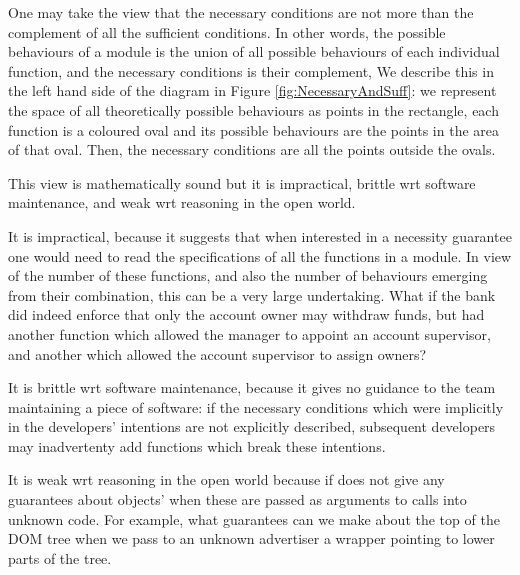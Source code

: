 One may take the view that the necessary conditions are not more than the complement of all the sufficient conditions.
In other words, the possible behaviours of a module is the union of all possible behaviours of 
each individual function, and the necessary conditions is their complement,
We describe this in the left hand side of the diagram in Figure \ref{fig:NecessaryAndSuff}: we 
represent the space of all theoretically possible behaviours as points in the rectangle, 
each function is a coloured oval and its possible behaviours are the points in the area of that oval.   
Then, the necessary conditions are all the points  outside the ovals.  

This view is mathematically sound but it is  impractical,  brittle wrt software maintenance, and weak wrt reasoning in the open world.



It is impractical, because it suggests that when interested in a necessity guarantee 
one would need to read the specifications of all the functions  in a module.
In view of the number of these functions, and also 
  the number of   behaviours emerging from their combination, this can be a  very large undertaking.
 What if the bank did indeed enforce that only the account
owner may withdraw funds, but had another function which allowed the manager
to appoint an account supervisor, and another which allowed the account supervisor to
assign owners?

It is brittle wrt software maintenance, because it
 gives no guidance to the team maintaining a piece of software: if the 
necessary conditions which were implicitly in the developers' intentions are not explicitly 
described, subsequent developers may inadvertenty add functions which break these intentions.

It is weak wrt reasoning in the open world because if does not give any guarantees about objects' when
these are passed as arguments to calls into unknown code. For example, what  guarantees  
can we make about the top of the DOM tree when we pass  to an unknown advertiser a wrapper 
pointing to lower parts of the tree.


